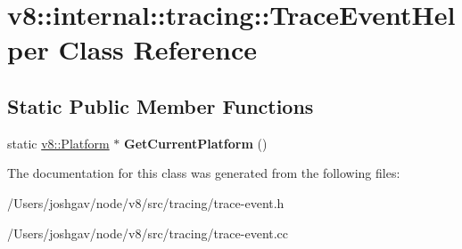 \hypertarget{classv8_1_1internal_1_1tracing_1_1_trace_event_helper}{}\section{v8\+:\+:internal\+:\+:tracing\+:\+:Trace\+Event\+Helper Class Reference}
\label{classv8_1_1internal_1_1tracing_1_1_trace_event_helper}
\subsection*{Static Public Member Functions}
\begin{DoxyCompactItemize}
\item 
static \hyperlink{classv8_1_1_platform}{v8\+::\+Platform} $\ast$ {\bfseries Get\+Current\+Platform} ()\hypertarget{classv8_1_1internal_1_1tracing_1_1_trace_event_helper_a8fa48d169dfb6b99a9ab3b634c48b69f}{}\label{classv8_1_1internal_1_1tracing_1_1_trace_event_helper_a8fa48d169dfb6b99a9ab3b634c48b69f}

\end{DoxyCompactItemize}


The documentation for this class was generated from the following files\+:\begin{DoxyCompactItemize}
\item 
/\+Users/joshgav/node/v8/src/tracing/trace-\/event.\+h\item 
/\+Users/joshgav/node/v8/src/tracing/trace-\/event.\+cc\end{DoxyCompactItemize}
